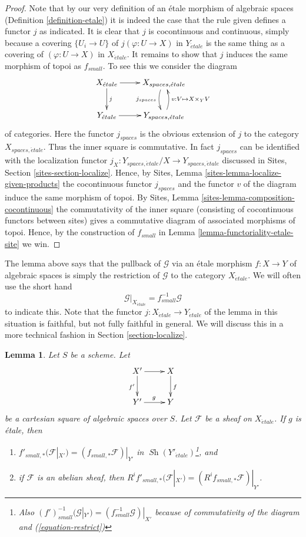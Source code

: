 \documentclass{stacks-project}
\theoremstyle{plain}
\newtheorem{lemma}[subsection]{Lemma}
\theoremstyle{definition}
\theoremstyle{remark}
\numberwithin{equation}{subsection}
\def\Sh{\mathop{\mathit{Sh}}\nolimits}
\def\etale{{\acute{e}tale}}
\begin{document}
\begin{proof}
Note that by our very definition of an \'etale morphism of algebraic spaces
(Definition \ref{definition-etale}) it is
indeed the case that the rule given defines a functor $j$ as indicated.
It is clear that $j$ is cocontinuous and continuous, simply because a covering
$\{U_i \to U\}$ of $j(\varphi : U \to X)$ in $Y_\etale$ is the
same thing as a covering of $(\varphi : U \to X)$ in $X_\etale$. It
remains to show that $j$ induces the same morphism of topoi as $f_{small}$.
To see this we consider the diagram
$$
\xymatrix{
X_\etale \ar[r] \ar[d]^j &
X_{spaces, \etale} \ar@/_/[d]_{j_{spaces}} \\
Y_\etale \ar[r] &
Y_{spaces, \etale} \ar@/_/[u]_{v : V \mapsto X \times_Y V}
}
$$
of categories. Here the functor $j_{spaces}$ is the obvious extension of $j$
to the category $X_{spaces, \etale}$. Thus the inner square is
commutative. In fact $j_{spaces}$ can be identified with the
localization functor
$j_X : Y_{spaces, \etale}/X \to Y_{spaces, \etale}$
discussed in
Sites, Section \ref{sites-section-localize}.
Hence, by
Sites, Lemma \ref{sites-lemma-localize-given-products}
the cocontinuous functor $j_{spaces}$ and the functor $v$ of the diagram
induce the same morphism of topoi. By
Sites, Lemma \ref{sites-lemma-composition-cocontinuous}
the commutativity of the inner square (consisting of cocontinuous functors
between sites) gives a commutative diagram of associated morphisms of topoi.
Hence, by the construction of $f_{small}$ in
Lemma \ref{lemma-functoriality-etale-site} we win.
\end{proof}

\noindent
The lemma above says that the pullback of $\mathcal{G}$ via an \'etale morphism
$f : X \to Y$ of algebraic spaces is simply the restriction of $\mathcal{G}$
to the category $X_\etale$. We will often use the short hand
\begin{equation}
\label{equation-restrict}
\mathcal{G}|_{X_\etale} = f_{small}^{-1}\mathcal{G}
\end{equation}
to indicate this. Note that the functor
$j : X_\etale \to Y_\etale$
of the lemma in this situation is faithful, but not fully faithful in
general. We will discuss this in a more technical fashion in
Section \ref{section-localize}.

\begin{lemma}
\label{lemma-pushforward-etale-base-change}
Let $S$ be a scheme. Let
$$
\xymatrix{
X' \ar[r] \ar[d]_{f'} & X \ar[d]^f \\
Y' \ar[r]^g & Y
}
$$
be a cartesian square of algebraic spaces over $S$. Let
$\mathcal{F}$ be a sheaf on $X_\etale$. If $g$ is \'etale, then
\begin{enumerate}
\item $f'_{small, *}(\mathcal{F}|_{X'}) = (f_{small, *}\mathcal{F})|_{Y'}$
in $\Sh(Y'_\etale)$\footnote{Also
$(f')_{small}^{-1}(\mathcal{G}|_{Y'}) = (f_{small}^{-1}\mathcal{G})|_{X'}$
because of commutativity of the diagram and (\ref{equation-restrict})}, and
\item if $\mathcal{F}$ is an abelian sheaf, then
$R^if'_{small, *}(\mathcal{F}|_{X'}) = (R^if_{small, *}\mathcal{F})|_{Y'}$.
\end{enumerate}
\end{lemma}
\end{document}

